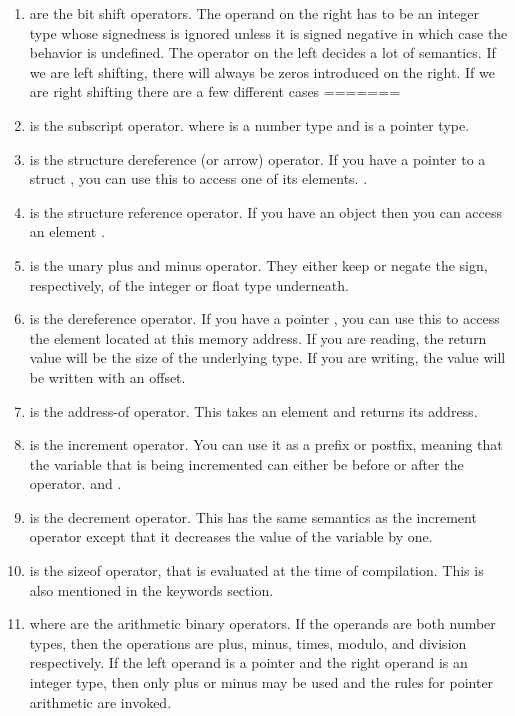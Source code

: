 \begin{enumerate}
\item \keyword{>>/<<} are the bit shift operators.
  The operand on the right has to be an integer type whose signedness is ignored unless it is signed negative in which case the behavior is undefined.
  The operator on the left decides a lot of semantics.
  If we are left shifting, there will always be zeros introduced on the right.
  If we are right shifting there are a few different cases
=======
	\item \keyword{[]} is the subscript operator.  where  is a number type and  is a pointer type.
	\item \keyword{->} is the structure dereference (or arrow) operator. If you have a pointer to a struct , you can use this to access one of its elements. .
	\item {} is the structure reference operator. If you have an object  then you can access an element .
	\item {} is the unary plus and minus operator. They either keep or negate the sign, respectively, of the integer or float type underneath.
	\item {} is the dereference operator. If you have a pointer , you can use this to access the element located at this memory address. If you are reading, the return value will be the size of the underlying type. If you are writing, the value will be written with an offset.
	\item {} is the address-of operator. This takes an element and returns its address.
	\item \keyword{++} is the increment operator. You can use it as a prefix or postfix, meaning that the variable that is being incremented can either be before or after the operator.  and .
	\item \keyword{--} is the decrement operator. This has the same semantics as the increment operator except that it decreases the value of the variable by one.
	\item {} is the sizeof operator, that is evaluated at the time of compilation. This is also mentioned in the keywords section.
	\item {} where  are the arithmetic binary operators. If the operands are both number types, then the operations are plus, minus, times, modulo, and division respectively. If the left operand is a pointer and the right operand is an integer type, then only plus or minus may be used and the rules for pointer arithmetic are invoked.

\end{enumerate}
